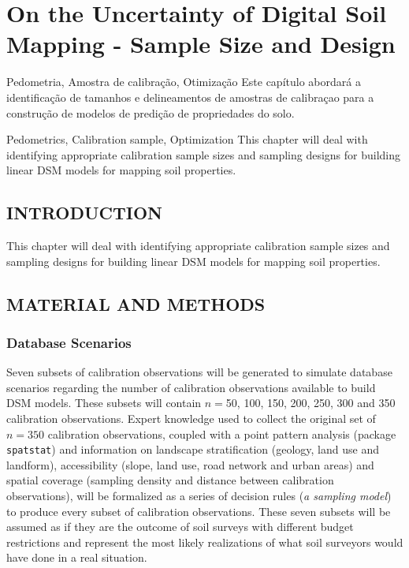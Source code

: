 \artigotrue
\chapter{On the Uncertainty of Digital Soil Mapping - Sample Size and Design}
\label{chap:chapter02}

\begin{chapterabstractPOR}{Pedometria, Amostra de calibração, Otimização}
Este capítulo abordará a identificação de tamanhos e delineamentos de amostras de calibraçao para a construção de modelos de predição de propriedades do solo.
\end{chapterabstractPOR}

\begin{chapterabstractENG}{Pedometrics, Calibration sample, Optimization}
This chapter will deal with identifying appropriate calibration sample sizes and sampling designs for building linear DSM models for mapping soil properties.
\end{chapterabstractENG}

\section{INTRODUCTION}

This chapter will deal with identifying appropriate calibration sample sizes and sampling designs for building linear DSM models for mapping soil properties. 

\section{MATERIAL AND METHODS}

\subsection{Database Scenarios}

Seven subsets of calibration observations will be generated to simulate database scenarios regarding the number of calibration observations available to build DSM models. These subsets will contain $n=$50, 100, 150, 200, 250, 300 and 350 calibration observations. Expert knowledge used to collect the original set of $n=350$ calibration observations, coupled with a point pattern analysis (package \texttt{spatstat}) and information on landscape stratification (geology, land use and landform), accessibility (slope, land use, road network and urban areas) and spatial coverage (sampling density and distance between calibration observations), will be formalized as a series of decision rules (\textit{a sampling model}) to produce every subset of calibration observations. These seven subsets will be assumed as if they are the outcome of soil surveys with different budget restrictions and represent the most likely realizations of what soil surveyors would have done in a real situation.

